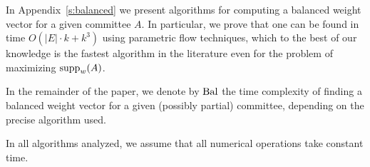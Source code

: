 In Appendix~\ref{s:balanced} we present algorithms for computing a balanced weight vector for a given committee $A$. 
In particular, we prove that one can be found in time $O(|E|\cdot k + k^3)$ using parametric flow techniques, which to the best of our knowledge is the fastest algorithm in the literature even for the problem of maximizing $\operatorname{supp}_w(A)$.

\begin{remark}\label{rem:bal}
In the remainder of the paper, we denote by $\operatorname{Bal}$ the time complexity of finding a balanced weight vector for a given (possibly partial) committee, depending on the precise algorithm used.
\end{remark}

\begin{remark}
In all algorithms analyzed, we assume that all numerical operations take constant time.
\end{remark}
